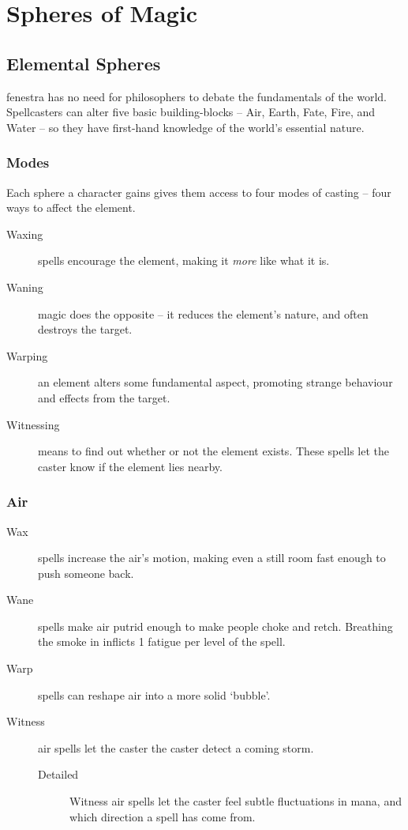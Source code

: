 \section{Spheres of Magic}

\begin{multicols}{2}

\subsection{Elemental Spheres}

\Gls{fenestra} has no need for philosophers to debate the fundamentals of the world.
Spellcasters can alter five basic building-blocks -- Air, Earth, Fate, Fire, and Water -- so they have first-hand knowledge of the world's essential nature.

\subsubsection{Modes}
Each sphere a character gains gives them access to four modes of casting -- four ways to affect the element.

\begin{description}
  \item[Waxing]
  spells encourage the element, making it \emph{more} like what it is.
  \item[Waning]
  magic does the opposite -- it reduces the element's nature, and often destroys the target.
  \item[Warping]
  an element alters some fundamental aspect, promoting strange behaviour and effects from the target.
  \item[Witnessing]
  means to find out whether or not the element exists.
  These spells let the caster know if the element lies nearby.
\end{description}

\subsubsection{Air}

\begin{description}
  \item[Wax]
  spells increase the air's motion, making even a still room fast enough to push someone back.
  \item[Wane]
  spells make air putrid enough to make people choke and retch.
  Breathing the smoke in inflicts 1 \gls{fatigue} per level of the spell.
  \item[Warp]
  spells can reshape air into a more solid `bubble'.
  \item[Witness]
  air spells let the caster the caster detect a coming storm.
  \begin{description}
    \item[Detailed]
      Witness air spells let the caster feel subtle fluctuations in mana, and which direction a spell has come from.
  \end{description}
\end{description}


\end{multicols}
